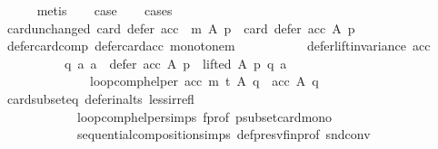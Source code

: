 \begin{isabellebody}
\ \ \ \ \isamarkupfalse%
\ metis\isanewline
\ \ \isamarkupfalse%
\ {\isacharquery}{\kern0pt}case\isanewline
\ \ \isamarkupfalse%
\ cases\isanewline
\ \ \ \ \isamarkupfalse%
\ card{\isacharunderscore}{\kern0pt}unchanged{\isacharcolon}{\kern0pt}\ {\isachardoublequoteopen}card\ {\isacharparenleft}{\kern0pt}defer\ {\isacharparenleft}{\kern0pt}acc\ {\isasymtriangleright}\ m{\isacharparenright}{\kern0pt}\ A\ p{\isacharparenright}{\kern0pt}\ {\isacharequal}{\kern0pt}\ card\ {\isacharparenleft}{\kern0pt}defer\ acc\ A\ p{\isacharparenright}{\kern0pt}{\isachardoublequoteclose}\isanewline
\ \ \ \ \isamarkupfalse%
\ defer{\isacharunderscore}{\kern0pt}card{\isacharunderscore}{\kern0pt}comp\ defer{\isacharunderscore}{\kern0pt}card{\isacharunderscore}{\kern0pt}acc\ monotone{\isacharunderscore}{\kern0pt}m\isanewline
\ \ \ \ \isamarkupfalse%
\isanewline
\ \ \ \ \ \ {\isachardoublequoteopen}defer{\isacharunderscore}{\kern0pt}lift{\isacharunderscore}{\kern0pt}invariance\ {\isacharparenleft}{\kern0pt}acc{\isacharparenright}{\kern0pt}\ {\isasymlongrightarrow}\isanewline
\ \ \ \ \ \ \ \ \ \ {\isacharparenleft}{\kern0pt}{\isasymforall}q\ a{\isachardot}{\kern0pt}\ {\isacharparenleft}{\kern0pt}a\ {\isasymin}\ {\isacharparenleft}{\kern0pt}defer\ {\isacharparenleft}{\kern0pt}acc{\isacharparenright}{\kern0pt}\ A\ p{\isacharparenright}{\kern0pt}\ {\isasymand}\ lifted\ A\ p\ q\ a{\isacharparenright}{\kern0pt}\ {\isasymlongrightarrow}\isanewline
\ \ \ \ \ \ \ \ \ \ \ \ \ \ {\isacharparenleft}{\kern0pt}loop{\isacharunderscore}{\kern0pt}comp{\isacharunderscore}{\kern0pt}helper\ acc\ m\ t{\isacharparenright}{\kern0pt}\ A\ q\ {\isacharequal}{\kern0pt}\ acc\ A\ q{\isacharparenright}{\kern0pt}{\isachardoublequoteclose}\isanewline
\ \ \ \ \ \ \isamarkupfalse%
\ card{\isacharunderscore}{\kern0pt}subset{\isacharunderscore}{\kern0pt}eq\ defer{\isacharunderscore}{\kern0pt}in{\isacharunderscore}{\kern0pt}alts\ less{\isacharunderscore}{\kern0pt}irrefl\isanewline
\ \ \ \ \ \ \ \ \ \ \ \ loop{\isacharunderscore}{\kern0pt}comp{\isacharunderscore}{\kern0pt}helper{\isachardot}{\kern0pt}simps{\isacharparenleft}{\kern0pt}{}{\isacharparenright}{\kern0pt}\ f{\isacharunderscore}{\kern0pt}prof\ psubset{\isacharunderscore}{\kern0pt}card{\isacharunderscore}{\kern0pt}mono\isanewline
\ \ \ \ \ \ \ \ \ \ \ \ sequential{\isacharunderscore}{\kern0pt}composition{\isachardot}{\kern0pt}simps\ def{\isacharunderscore}{\kern0pt}presv{\isacharunderscore}{\kern0pt}fin{\isacharunderscore}{\kern0pt}prof\ snd{\isacharunderscore}{\kern0pt}conv\isanewline

\end{isabellebody}
